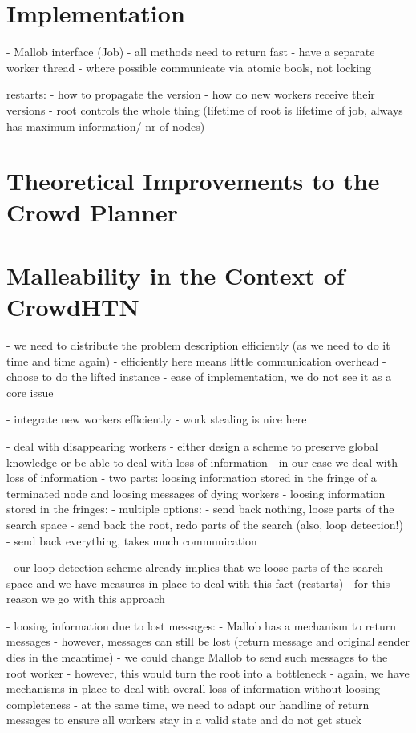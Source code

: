 \documentclass[enabledeprecatedfontcommands,12pt,a4paper,twoside]{scrartcl}
\numberwithin{equation}{section}
\begin{document}
\section{Implementation}
- Mallob interface (Job)
- all methods need to return fast
- have a separate worker thread
- where possible communicate via atomic bools, not locking




restarts:
- how to propagate the version
- how do new workers receive their versions
- root controls the whole thing (lifetime of root is lifetime of job, always has maximum information/ nr of nodes)

\section{Theoretical Improvements to the Crowd Planner}




\section{Malleability in the Context of CrowdHTN}
- we need to distribute the problem description efficiently (as we need to do it time and time again)
	- efficiently here means little communication overhead
	- choose to do the lifted instance
	- ease of implementation, we do not see it as a core issue

- integrate new workers efficiently
	- work stealing is nice here

- deal with disappearing workers
	- either design a scheme to preserve global knowledge or be able to deal with loss of information
	- in our case we deal with loss of information
	- two parts: loosing information stored in the fringe of a terminated node and loosing messages of dying workers
	- loosing information stored in the fringes:
		- multiple options:
			- send back nothing, loose parts of the search space
			- send back the root, redo parts of the search (also, loop detection!)
			- send back everything, takes much communication
			
			- our loop detection scheme already implies that we loose parts of the search space and we have measures in place to deal with this fact (restarts)
			- for this reason we go with this approach
			
	- loosing information due to lost messages:
		- Mallob has a mechanism to return messages
		- however, messages can still be lost (return message and original sender dies in the meantime)
		- we could change Mallob to send such messages to the root worker
		- however, this would turn the root into a bottleneck
		- again, we have mechanisms in place to deal with overall loss of information without loosing completeness
		- at the same time, we need to adapt our handling of return messages to ensure all workers stay in a valid state and do not get stuck
		
\end{document}
